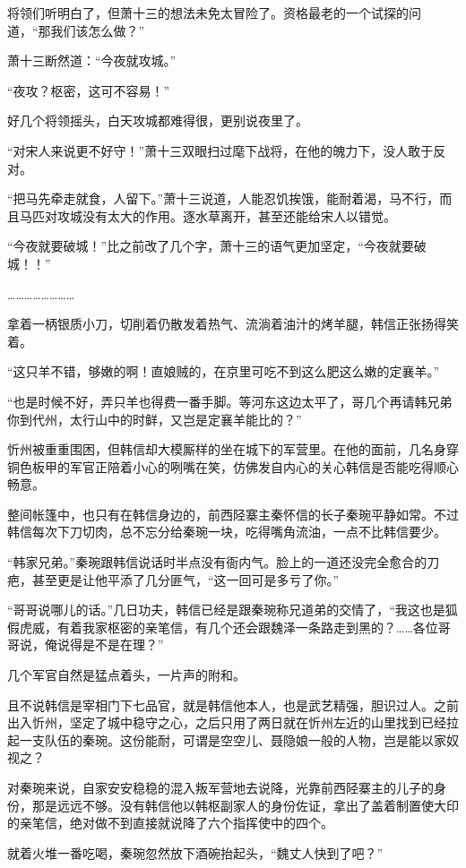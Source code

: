 将领们听明白了，但萧十三的想法未免太冒险了。资格最老的一个试探的问道，“那我们该怎么做？”

萧十三断然道：“今夜就攻城。”

“夜攻？枢密，这可不容易！”

好几个将领摇头，白天攻城都难得很，更别说夜里了。

“对宋人来说更不好守！”萧十三双眼扫过麾下战将，在他的魄力下，没人敢于反对。

“把马先牵走就食，人留下。”萧十三说道，人能忍饥挨饿，能耐着渴，马不行，而且马匹对攻城没有太大的作用。逐水草离开，甚至还能给宋人以错觉。

“今夜就要破城！”比之前改了几个字，萧十三的语气更加坚定，“今夜就要破城！！”

……………………

拿着一柄银质小刀，切削着仍散发着热气、流淌着油汁的烤羊腿，韩信正张扬得笑着。

“这只羊不错，够嫩的啊！直娘贼的，在京里可吃不到这么肥这么嫩的定襄羊。”

“也是时候不好，弄只羊也得费一番手脚。等河东这边太平了，哥几个再请韩兄弟你到代州，太行山中的时鲜，又岂是定襄羊能比的？”

忻州被重重围困，但韩信却大模厮样的坐在城下的军营里。在他的面前，几名身穿铜色板甲的军官正陪着小心的咧嘴在笑，仿佛发自内心的关心韩信是否能吃得顺心畅意。

整间帐篷中，也只有在韩信身边的，前西陉寨主秦怀信的长子秦琬平静如常。不过韩信每次下刀切肉，总不忘分给秦琬一块，吃得嘴角流油，一点不比韩信要少。

“韩家兄弟。”秦琬跟韩信说话时半点没有衙内气。脸上的一道还没完全愈合的刀疤，甚至更是让他平添了几分匪气，“这一回可是多亏了你。”

“哥哥说哪儿的话。”几日功夫，韩信已经是跟秦琬称兄道弟的交情了，“我这也是狐假虎威，有着我家枢密的亲笔信，有几个还会跟魏泽一条路走到黑的？……各位哥哥说，俺说得是不是在理？”

几个军官自然是猛点着头，一片声的附和。

且不说韩信是宰相门下七品官，就是韩信他本人，也是武艺精强，胆识过人。之前出入忻州，坚定了城中稳守之心，之后只用了两日就在忻州左近的山里找到已经拉起一支队伍的秦琬。这份能耐，可谓是空空儿、聂隐娘一般的人物，岂是能以家奴视之？

对秦琬来说，自家安安稳稳的混入叛军营地去说降，光靠前西陉寨主的儿子的身份，那是远远不够。没有韩信他以韩枢副家人的身份佐证，拿出了盖着制置使大印的亲笔信，绝对做不到直接就说降了六个指挥使中的四个。

就着火堆一番吃喝，秦琬忽然放下酒碗抬起头，“魏丈人快到了吧？”


